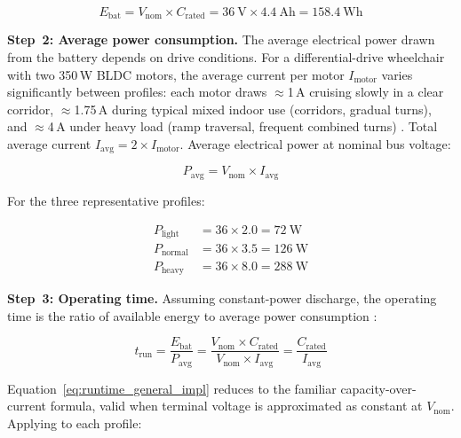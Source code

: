 \documentclass[12pt,a4paper]{report}
\begin{document}
\begin{equation}
  E_\text{bat} = V_\text{nom} \times C_\text{rated}
  = \SI{36}{\volt} \times \SI{4.4}{\ampere\hour}
  = \SI{158.4}{\watt\hour}
  \label{eq:energy_bat_impl}
\end{equation}

\medskip
\noindent\textbf{Step~2: Average power consumption.}
The average electrical power drawn from the battery depends on drive
conditions. For a differential-drive wheelchair with two 350\,W BLDC
motors, the average current per motor $I_\text{motor}$ varies
significantly between profiles: each motor draws $\approx$1\,A
cruising slowly in a clear corridor, $\approx$1.75\,A during typical
mixed indoor use (corridors, gradual turns), and $\approx$4\,A under
heavy load (ramp traversal, frequent combined
turns) \cite{cooper2006motorized, frizera2012smart}. Total average
current $I_\text{avg} = 2 \times I_\text{motor}$. Average electrical
power at nominal bus voltage:

\begin{equation}
  P_\text{avg} = V_\text{nom} \times I_\text{avg}
  \label{eq:avg_power_gen_impl}
\end{equation}

For the three representative profiles:

\begin{align}
  P_\text{light}  &= 36 \times 2.0 = \SI{72}{\watt}
  \label{eq:p_light_impl} \\
  P_\text{normal} &= 36 \times 3.5 = \SI{126}{\watt}
  \label{eq:p_normal_impl} \\
  P_\text{heavy}  &= 36 \times 8.0 = \SI{288}{\watt}
  \label{eq:p_heavy_impl}
\end{align}

\medskip
\noindent\textbf{Step~3: Operating time.}
Assuming constant-power discharge, the operating time is the ratio of
available energy to average power consumption \cite{linden2011handbook}:

\begin{equation}
  \boxed{t_\text{run} = \frac{E_\text{bat}}{P_\text{avg}}
  = \frac{V_\text{nom} \times C_\text{rated}}{V_\text{nom} \times I_\text{avg}}
  = \frac{C_\text{rated}}{I_\text{avg}}}
  \label{eq:runtime_general_impl}
\end{equation}

Equation~\eqref{eq:runtime_general_impl} reduces to the familiar
capacity-over-current formula, valid when terminal voltage is
approximated as constant at $V_\text{nom}$. Applying to each profile:
\end{document}
